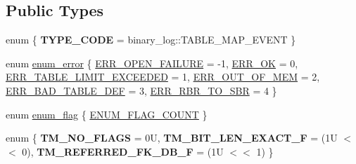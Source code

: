 \subsection*{Public Types}
\begin{DoxyCompactItemize}
\item 
enum \{ {\bfseries T\+Y\+P\+E\+\_\+\+C\+O\+DE} = binary\+\_\+log\+:\+:T\+A\+B\+L\+E\+\_\+\+M\+A\+P\+\_\+\+E\+V\+E\+NT
 \}
\item 
enum \mbox{\hyperlink{classTable__map__log__event_ae8795bd269eafd91a88c631e2ec1e6f0}{enum\+\_\+error}} \{ \newline
\mbox{\hyperlink{classTable__map__log__event_ae8795bd269eafd91a88c631e2ec1e6f0a3d0a25405fff1d9f4d919abeaa6c7a4f}{E\+R\+R\+\_\+\+O\+P\+E\+N\+\_\+\+F\+A\+I\+L\+U\+RE}} = -\/1, 
\mbox{\hyperlink{classTable__map__log__event_ae8795bd269eafd91a88c631e2ec1e6f0a1a8d81f98196f7ccf0fb086174c5e40f}{E\+R\+R\+\_\+\+OK}} = 0, 
\mbox{\hyperlink{classTable__map__log__event_ae8795bd269eafd91a88c631e2ec1e6f0a3648c0aa120bc2187a5b0773676c85ea}{E\+R\+R\+\_\+\+T\+A\+B\+L\+E\+\_\+\+L\+I\+M\+I\+T\+\_\+\+E\+X\+C\+E\+E\+D\+ED}} = 1, 
\mbox{\hyperlink{classTable__map__log__event_ae8795bd269eafd91a88c631e2ec1e6f0a3ffa0b1695f85a5e0bb281c0dfee110a}{E\+R\+R\+\_\+\+O\+U\+T\+\_\+\+O\+F\+\_\+\+M\+EM}} = 2, 
\newline
\mbox{\hyperlink{classTable__map__log__event_ae8795bd269eafd91a88c631e2ec1e6f0a5cefa13743f3222ea9fd7a88bc974130}{E\+R\+R\+\_\+\+B\+A\+D\+\_\+\+T\+A\+B\+L\+E\+\_\+\+D\+EF}} = 3, 
\mbox{\hyperlink{classTable__map__log__event_ae8795bd269eafd91a88c631e2ec1e6f0ac11898262369b9c5537fe3186c44dbcd}{E\+R\+R\+\_\+\+R\+B\+R\+\_\+\+T\+O\+\_\+\+S\+BR}} = 4
 \}
\item 
enum \mbox{\hyperlink{classTable__map__log__event_a688364b7746acec26aab34fa3ac37cf7}{enum\+\_\+flag}} \{ \mbox{\hyperlink{classTable__map__log__event_a688364b7746acec26aab34fa3ac37cf7ae6cbf7133b45d85614a433043c50ec27}{E\+N\+U\+M\+\_\+\+F\+L\+A\+G\+\_\+\+C\+O\+U\+NT}}
 \}
\item 
enum \{ {\bfseries T\+M\+\_\+\+N\+O\+\_\+\+F\+L\+A\+GS} = 0U, 
{\bfseries T\+M\+\_\+\+B\+I\+T\+\_\+\+L\+E\+N\+\_\+\+E\+X\+A\+C\+T\+\_\+F} = (1U $<$$<$ 0), 
{\bfseries T\+M\+\_\+\+R\+E\+F\+E\+R\+R\+E\+D\+\_\+\+F\+K\+\_\+\+D\+B\+\_\+F} = (1U $<$$<$ 1)
 \}
\end{DoxyCompactItemize}
